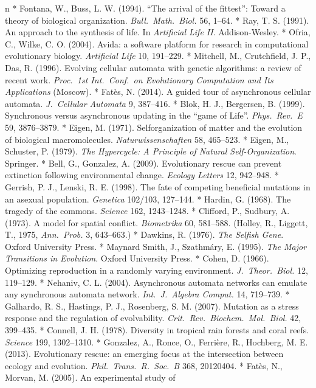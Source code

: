 \begitems\style n
* Fontana, W., Buss, L. W. (1994). “The arrival of the fittest”:
Toward a theory of biological organization. {\it Bull.\ Math.\
Biol.} 56, 1--64.
* Ray, T. S. (1991). An approach to the synthesis of life. In
{\it Artificial Life II}. Addison-Wesley.
* Ofria, C., Wilke, C. O. (2004). Avida: a software platform for
research in computational evolutionary biology. {\it Artificial
Life} 10, 191--229.
* Mitchell, M., Crutchfield, J. P., Das, R. (1996). Evolving
cellular automata with genetic algorithms: a review of recent
work. {\it Proc.\ 1st Int.\ Conf.\ on Evolutionary Computation and
Its Applications} (Moscow).
* Fatès, N. (2014). A guided tour of asynchronous cellular
automata. {\it J.\ Cellular Automata} 9, 387--416.
* Blok, H. J., Bergersen, B. (1999). Synchronous versus
asynchronous updating in the “game of Life”. {\it Phys.\ Rev.\
E} 59, 3876--3879.
* Eigen, M. (1971). Selforganization of matter and the evolution
of biological macromolecules. {\it Naturwissenschaften} 58,
465--523.
* Eigen, M., Schuster, P. (1979). {\it The Hypercycle: A Principle
of Natural Self-Organization}. Springer.
* Bell, G., Gonzalez, A. (2009). Evolutionary rescue can prevent
extinction following environmental change. {\it Ecology Letters}
12, 942--948.
* Gerrish, P. J., Lenski, R. E. (1998). The fate of competing
beneficial mutations in an asexual population. {\it Genetica}
102/103, 127--144.
* Hardin, G. (1968). The tragedy of the commons. {\it Science}
162, 1243--1248.
* Clifford, P., Sudbury, A. (1973). A model for spatial conflict.
{\it Biometrika} 60, 581--588. (Holley, R., Liggett, T., 1975,
{\it Ann.\ Prob.} 3, 643--663.)
* Dawkins, R. (1976). {\it The Selfish Gene}. Oxford University
Press.
* Maynard Smith, J., Szathmáry, E. (1995). {\it The Major
Transitions in Evolution}. Oxford University Press.
* Cohen, D. (1966). Optimizing reproduction in a randomly varying
environment. {\it J.\ Theor.\ Biol.} 12, 119--129.
* Nehaniv, C. L. (2004). Asynchronous automata networks can
emulate any synchronous automata network. {\it Int.\ J.\ Algebra
Comput.} 14, 719--739.
* Galhardo, R. S., Hastings, P. J., Rosenberg, S. M. (2007).
Mutation as a stress response and the regulation of evolvability.
{\it Crit.\ Rev.\ Biochem.\ Mol.\ Biol.} 42, 399--435.
* Connell, J. H. (1978). Diversity in tropical rain forests and
coral reefs. {\it Science} 199, 1302--1310.
* Gonzalez, A., Ronce, O., Ferrière, R., Hochberg, M. E. (2013).
Evolutionary rescue: an emerging focus at the intersection between
ecology and evolution. {\it Phil.\ Trans.\ R.\ Soc.\ B} 368,
20120404.
* Fatès, N., Morvan, M. (2005). An experimental study of
